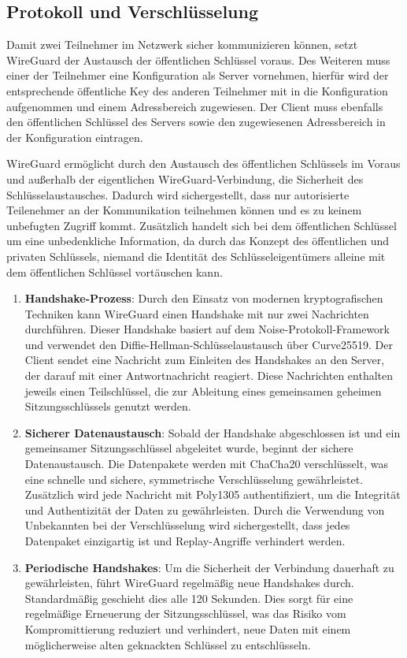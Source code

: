 \subsection{Protokoll und Verschlüsselung}

Damit zwei Teilnehmer im Netzwerk sicher kommunizieren können, setzt WireGuard der Austausch der öffentlichen Schlüssel voraus. Des Weiteren muss einer der Teilnehmer eine Konfiguration als Server vornehmen, hierfür wird der entsprechende öffentliche Key des anderen Teilnehmer mit in die Konfiguration aufgenommen und einem Adressbereich zugewiesen. Der Client muss ebenfalls den öffentlichen Schlüssel des Servers sowie den zugewiesenen Adressbereich in der Konfiguration eintragen. \cite{Wireguard_Whitepaper}

WireGuard ermöglicht durch den Austausch des öffentlichen Schlüssels im Voraus und außerhalb der eigentlichen WireGuard-Verbindung, die Sicherheit des Schlüsselaustausches. Dadurch wird sichergestellt, dass nur autorisierte Teilenehmer an der Kommunikation teilnehmen können und es zu keinem unbefugten Zugriff kommt. Zusätzlich handelt sich bei dem öffentlichen Schlüssel um eine unbedenkliche Information, da durch das Konzept des öffentlichen und privaten Schlüssels, niemand die Identität des Schlüsseleigentümers alleine mit dem öffentlichen Schlüssel vortäuschen kann.

\begin{enumerate}
    \item \textbf{Handshake-Prozess}: Durch den Einsatz von modernen kryptografischen Techniken kann WireGuard einen Handshake mit nur zwei Nachrichten durchführen. Dieser Handshake basiert auf dem Noise-Protokoll-Framework und verwendet den Diffie-Hellman-Schlüsselaustausch über Curve25519. Der Client sendet eine Nachricht zum Einleiten des Handshakes an den Server, der darauf mit einer Antwortnachricht reagiert. Diese Nachrichten enthalten jeweils einen Teilschlüssel, die zur Ableitung eines gemeinsamen geheimen Sitzungsschlüssels genutzt werden.
    \item \textbf{Sicherer Datenaustausch}: Sobald der Handshake abgeschlossen ist und ein gemeinsamer Sitzungsschlüssel abgeleitet wurde, beginnt der sichere Datenaustausch. Die Datenpakete werden mit ChaCha20 verschlüsselt, was eine schnelle und sichere, symmetrische Verschlüsselung gewährleistet. Zusätzlich wird jede Nachricht mit Poly1305 authentifiziert, um die Integrität und Authentizität der Daten zu gewährleisten. Durch die Verwendung von Unbekannten bei der Verschlüsselung wird sichergestellt, dass jedes Datenpaket einzigartig ist und Replay-Angriffe verhindert werden.
    \item \textbf{Periodische Handshakes}: Um die Sicherheit der Verbindung dauerhaft zu gewährleisten, führt WireGuard regelmäßig neue Handshakes durch. Standardmäßig geschieht dies alle 120 Sekunden. Dies sorgt für eine regelmäßige Erneuerung der Sitzungsschlüssel, was das Risiko vom Kompromittierung reduziert und verhindert, neue Daten mit einem möglicherweise alten geknackten Schlüssel zu entschlüsseln.
\end{enumerate}

